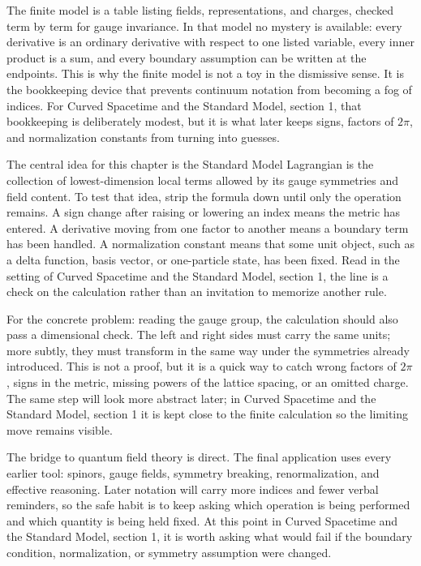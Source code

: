 The finite model is a table listing fields, representations, and charges, checked term by term for gauge invariance.  In that model no mystery is available: every derivative is an ordinary derivative with respect to one listed variable, every inner product is a sum, and every boundary assumption can be written at the endpoints.  This is why the finite model is not a toy in the dismissive sense.  It is the bookkeeping device that prevents continuum notation from becoming a fog of indices.  For Curved Spacetime and the Standard Model, section 1, that bookkeeping is deliberately modest, but it is what later keeps signs, factors of \(2\pi\), and normalization constants from turning into guesses.

The central idea for this chapter is the Standard Model Lagrangian is the collection of lowest-dimension local terms allowed by its gauge symmetries and field content.  To test that idea, strip the formula down until only the operation remains.  A sign change after raising or lowering an index means the metric has entered.  A derivative moving from one factor to another means a boundary term has been handled.  A normalization constant means that some unit object, such as a delta function, basis vector, or one-particle state, has been fixed.  Read in the setting of Curved Spacetime and the Standard Model, section 1, the line is a check on the calculation rather than an invitation to memorize another rule.

For the concrete problem: reading the gauge group, the calculation should also pass a dimensional check.  The left and right sides must carry the same units; more subtly, they must transform in the same way under the symmetries already introduced.  This is not a proof, but it is a quick way to catch wrong factors of \(2\pi\), signs in the metric, missing powers of the lattice spacing, or an omitted charge.  The same step will look more abstract later; in Curved Spacetime and the Standard Model, section 1 it is kept close to the finite calculation so the limiting move remains visible.

The bridge to quantum field theory is direct.  The final application uses every earlier tool: spinors, gauge fields, symmetry breaking, renormalization, and effective reasoning.  Later notation will carry more indices and fewer verbal reminders, so the safe habit is to keep asking which operation is being performed and which quantity is being held fixed.  At this point in Curved Spacetime and the Standard Model, section 1, it is worth asking what would fail if the boundary condition, normalization, or symmetry assumption were changed.

